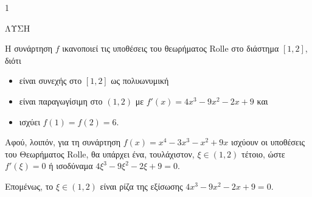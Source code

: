\begin{ylh}{1}
    \item [Ύλη από εικόνα]
\end{ylh}
ΛΥΣΗ

\begin{alist}
\item Η συνάρτηση $f$ ικανοποιεί τις υποθέσεις του θεωρήματος Rolle στο διάστημα $[1,2]$, διότι
\begin{itemize}
    \item είναι συνεχής στο $[1,2]$ ως πολυωνυμική
    \item είναι παραγωγίσιμη στο $(1,2)$ με $f'(x) = 4x^3 - 9x^2 - 2x + 9$ και
    \item ισχύει $f(1) = f(2) = 6$.
\end{itemize}
\item Αφού, λοιπόν, για τη συνάρτηση $f(x) = x^4 - 3x^3 - x^2 + 9x$ ισχύουν οι υποθέσεις του Θεωρήματος Rolle, θα υπάρχει ένα, τουλάχιστον, $\xi \in (1,2)$ τέτοιο, ώστε $f'(\xi) = 0$ ή ισοδύναμα $4\xi^3 - 9\xi^2 - 2\xi + 9 = 0$.

Επομένως, το $\xi \in (1,2)$ είναι ρίζα της εξίσωσης $4x^3 - 9x^2 - 2x + 9 = 0$.
\end{alist}